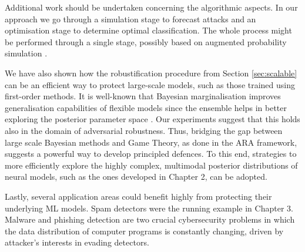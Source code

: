 

Additional work should be undertaken concerning the
algorithmic aspects.  In our approach  we go through a simulation stage to forecast attacks and an optimisation stage to determine optimal classification. The whole process might be performed through a single stage, possibly based on augmented probability simulation \parencite{ekin2019augmented}.

We have also shown how the robustification procedure from Section \ref{sec:scalable} can be an efficient way to protect large-scale models, such as those trained using first-order methods. It is well-known that Bayesian marginalisation improves generalisation capabilities of flexible models since the ensemble helps in better exploring the posterior parameter space \parencite{wilson2020bayesian}. Our experiments suggest 
that this holds also in the domain of adversarial robustness. Thus, bridging the gap between large scale Bayesian methods and Game Theory, as  done in the ARA framework, suggests a powerful way to develop principled defences. To this end, strategies to more efficiently explore the highly complex, multimodal posterior distributions of neural models, such as the ones developed in Chapter 2, can be adopted.

Lastly, several application areas could benefit highly from
protecting their underlying ML models. Spam detectors were
the running example in Chapter 3. Malware and phishing detection are two
crucial cybersecurity problems in which the data distribution of computer programs is constantly changing, driven by attacker's interests in evading detectors. %




